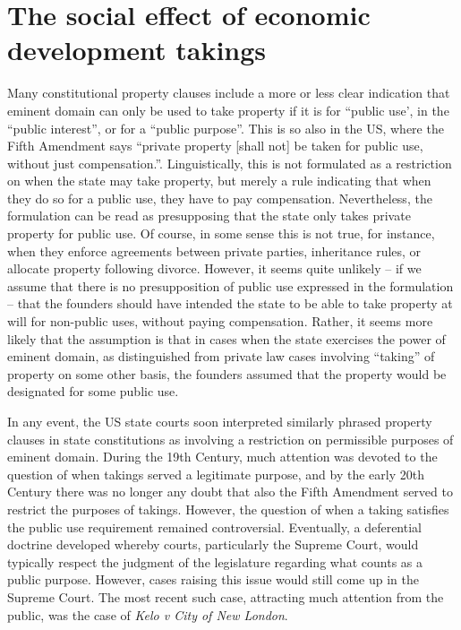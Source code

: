 \section{The social effect of economic development takings}

Many constitutional property clauses include a more or less clear indication that eminent domain can only be used to take property if it is for ``public use', in the ``public interest'', or for a ``public purpose''. This is so also in the US, where the Fifth Amendment says ``private property [shall not] be taken for public use, without just compensation.”.  Linguistically, this is not formulated as a restriction on when the state may take property, but merely a rule indicating that when they do so for a public use, they have to pay compensation. Nevertheless, the formulation can be read as presupposing that the state only takes private property for public use. Of course, in some sense this is not true, for instance, when they enforce agreements between private parties, inheritance rules, or allocate property following divorce. However, it seems quite unlikely -- if we assume that there is no presupposition of public use expressed in the formulation -- that the founders should have intended the state to be able to take property at will for non-public uses, without paying compensation. Rather, it seems more likely that the assumption is that in cases when the state exercises the power of eminent domain, as distinguished from private law cases involving ``taking'' of property on some other basis, the founders assumed that the property would be designated for some public use.

In any event, the US state courts soon interpreted similarly phrased property clauses in state constitutions as involving a restriction on permissible purposes of eminent domain. During the 19th Century, much attention was devoted to the question of when takings served a legitimate purpose, and by the early 20th Century there was no longer any doubt that also the Fifth Amendment served to restrict the purposes of takings. However, the question of when a taking satisfies the public use requirement remained controversial. Eventually, a deferential doctrine developed whereby courts, particularly the Supreme Court, would typically respect the judgment of the legislature regarding what counts as a public purpose. However, cases raising this issue would still come up in the Supreme Court. The most recent such case, attracting much attention from the public, was the case of {\it Kelo v City of New London}.


